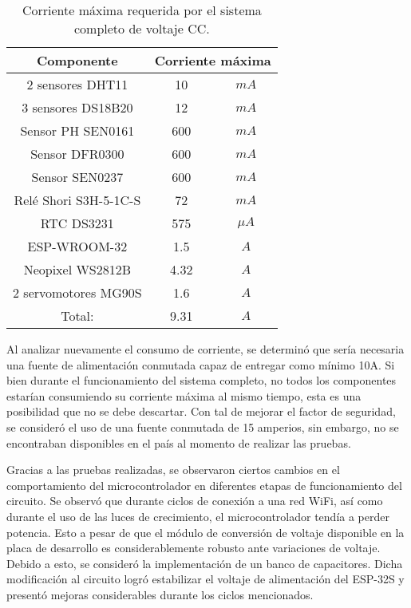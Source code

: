 \begin{table}[H]
	\centering
	\begin{tabular}{|c|c|c|} \hline
		\textbf{Componente} & \multicolumn{2}{c|}{\textbf{Corriente máxima}} \\ \hline
		2 sensores DHT11 & 10 & $mA$ \\ \hline
		3 sensores DS18B20 & 12 & $mA$ \\ \hline
		Sensor PH SEN0161 & 600 & $mA$ \\ \hline
		Sensor DFR0300 & 600 & $mA$ \\ \hline
		Sensor SEN0237 & 600 & $mA$ \\ \hline
		Relé Shori S3H-5-1C-S & 72 & $mA$ \\ \hline
		RTC DS3231 & 575 & $\mu A$ \\ \hline
		ESP-WROOM-32 & 1.5 & $A$ \\ \hline
		Neopixel WS2812B & 4.32 & $A$ \\ \hline
		2 servomotores MG90S & 1.6 & $A$ \\ \hline
		Total: & 9.31 & $A$ \\ \hline
	\end{tabular}
	\caption{Corriente máxima requerida por el sistema completo de voltaje CC.}
	\label{cuadro:corriente_maxima}
\end{table}

Al analizar nuevamente el consumo de corriente, se determinó que sería necesaria una fuente de alimentación conmutada capaz de entregar como mínimo 10A. Si bien durante el funcionamiento del sistema completo, no todos los componentes estarían consumiendo su corriente máxima al mismo tiempo, esta es una posibilidad que no se debe descartar. Con tal de mejorar el factor de seguridad, se consideró el uso de una fuente conmutada de 15 amperios, sin embargo, no se encontraban disponibles en el país al momento de realizar las pruebas.

Gracias a las pruebas realizadas, se observaron ciertos cambios en el comportamiento del microcontrolador en diferentes etapas de funcionamiento del circuito. Se observó que durante ciclos de conexión a una red WiFi, así como durante el uso de las luces de crecimiento, el microcontrolador tendía a perder potencia. Esto a pesar de que el módulo de conversión de voltaje disponible en la placa de desarrollo es considerablemente robusto ante variaciones de voltaje. Debido a esto, se consideró la implementación de un banco de capacitores. Dicha modificación al circuito logró estabilizar el voltaje de alimentación del ESP-32S y presentó mejoras considerables durante los ciclos mencionados.

